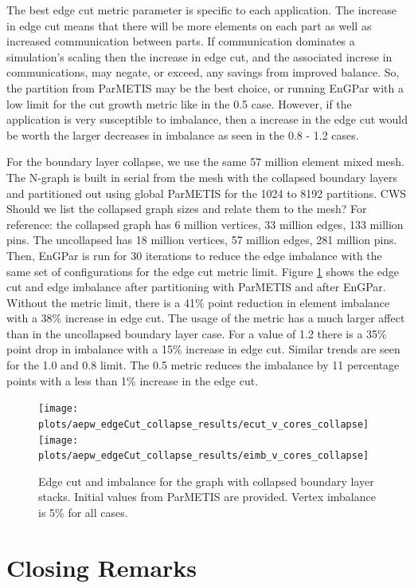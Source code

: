 \documentclass[conference]{IEEEtran}
\begin{document}
The best edge cut metric parameter is specific to each application. The increase in
edge cut means that there will be more elements on each part as well as
increased communication
between parts. If communication dominates a simulation's scaling then the increase in
edge cut, and the associated increse in communications, may negate, or exceed,
any savings from improved balance. So, the partition from ParMETIS may
be the best choice, or running EnGPar with a low limit for the cut growth metric like in the
0.5 case. However, if the application is very susceptible to imbalance, then a increase in the
edge cut would be worth the larger decreases in imbalance as seen in the 0.8 - 1.2 cases.

For the boundary layer collapse, we use the same 57 million element mixed mesh. The N-graph is
built in serial from the mesh with the collapsed boundary layers and partitioned
out using global ParMETIS for the 1024 to 8192 partitions.
{\color{red} CWS Should we list the collapsed graph sizes and relate them to the mesh? For reference: the collapsed graph has 6 million vertices, 33 million edges, 133 million pins. The uncollapsed has 18 million vertices, 57 million edges, 281 million pins.}
Then, EnGPar is run for 30 iterations to reduce the edge imbalance with the same set of
configurations for the edge cut metric limit. Figure \ref{fig:collapse}
shows the edge cut and edge imbalance after partitioning with
ParMETIS and after EnGPar. Without the metric limit, there is a 41\% point reduction in
element imbalance with a 38\% increase in edge cut. The usage of the metric has a much larger
affect than in the uncollapsed boundary layer case. For a value of 1.2 there is a 35\% point
drop in imbalance with a 15\% increase in edge cut. Similar trends are seen for the 1.0 and 0.8
limit. The 0.5 metric reduces the imbalance by 11 percentage points with a less than 1\% increase in the
edge cut.


\begin{figure}[!ht]
  \centering
  \texttt{[image: plots/aepw\_edgeCut\_collapse\_results/ecut\_v\_cores\_collapse]}
  \texttt{[image: plots/aepw\_edgeCut\_collapse\_results/eimb\_v\_cores\_collapse]}
  \caption{Edge cut and imbalance for the graph with collapsed boundary layer stacks. Initial values from ParMETIS are provided. Vertex imbalance is 5\% for all cases.}
  \label{fig:collapse}
\end{figure}

\section{Closing Remarks} \label{sec:closing}
\end{document}
